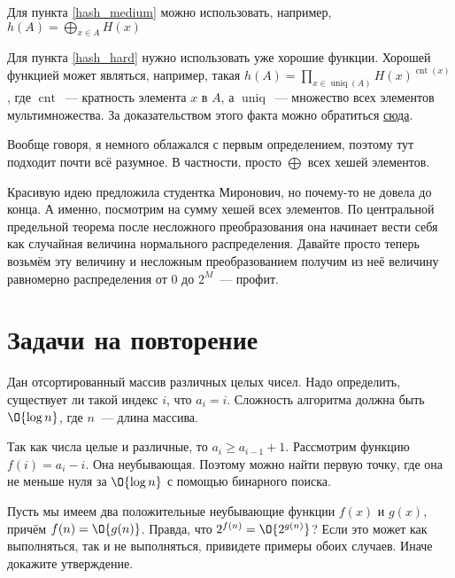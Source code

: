 \documentclass[addpoints]{exam}
\DeclareMathOperator{\uniq}{uniq}
\DeclareMathOperator{\cnt}{cnt}
\begin{document}
\begin{questions}
\begin{solution}
Для пункта \ref{hash_medium} можно использовать, например, $h(A) = \bigoplus\limits_{x \in A} H(x)$

Для пункта \ref{hash_hard} нужно использовать уже хорошие функции. Хорошей функцией может являться, например, такая $h(A) = \prod\limits_{x \in \uniq(A)} H(x)^{\cnt(x)}$, где $\cnt$~--- кратность элемента $x$ в $A$, а $\uniq$~--- множество всех элементов мультимножества. За доказательством этого факта можно обратиться \href{http://link.springer.com/chapter/10.1007%2F978-3-540-40061-5_12}{сюда}.

Вообще говоря, я немного облажался с первым определением, поэтому тут подходит почти всё разумное. В частности, просто $\bigoplus$ всех хешей элементов. 

Красивую идею предложила студентка Миронович, но почему-то не довела до конца. А именно, посмотрим на сумму хешей всех элементов. По центральной предельной теорема после несложного преобразования она начинает вести себя как случайная величина нормального распределения. Давайте просто теперь возьмём эту величину и несложным преобразованием получим из неё величину равномерно распределения от $0$ до $2^M$~--- профит. 

\end{solution}

\section{Задачи на повторение}

\question[\half] \label{binary_search} Дан отсортированный массив различных целых чисел. Надо определить, существует ли такой индекс $i$, что $a_i = i$. Сложность алгоритма должна быть $\O{\log{n}}$, где $n$~--- длина массива.

\begin{solution}

Так как числа целые и различные, то $a_i \geqslant a_{i - 1} + 1$. Рассмотрим функцию $f(i) = a_i - i$. Она неубывающая. Поэтому можно найти первую точку, где она не меньше нуля за $\O{\log{n}}$ с помощью бинарного поиска.

\end{solution}

\question[\half] Пусть мы имеем два положительные неубывающие функции $f(x)$ и $g(x)$, причём $f(n) = \O{g(n)}$. Правда, что $2^{f(n)} = \O{2^{g(n)}}$? Если это может как выполняться, так и не выполняться, привидете примеры обоих случаев. Иначе докажите утверждение.

\begin{solution}


\end{solution}
\end{questions}
\end{document}
